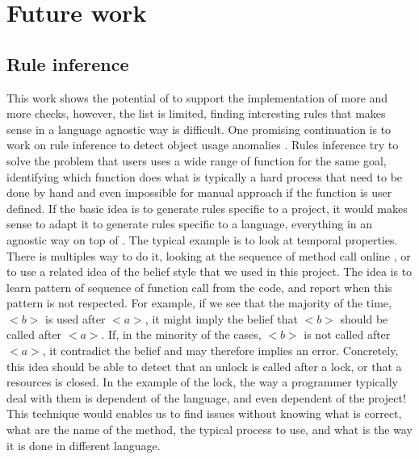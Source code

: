 \section{Future work}
\label{sec:future_work}

\subsection{Rule inference}
\label{subsec:rule_inference}

This work shows the potential of \slang{} to support the implementation of more and more checks, however, the list is limited, finding interesting rules that makes sense in a language agnostic way is difficult. 
One promising continuation is to work on rule inference to detect object usage anomalies \cite{Wasylkowski:2007:DOU:1287624.1287632}. \newline
Rules inference try to solve the problem that users uses a wide range of function for the same goal,  identifying which function does what is typically a hard process that need to be done by hand and even impossible for manual approach if the function is user defined. 
If the basic idea is to generate rules specific to a project, it would makes sense to adapt it to generate rules specific to a language, everything in an agnostic way on top of \slang{}. 
The typical example is to look at temporal properties. 
There is multiples way to do it, looking at the sequence of method call online \cite{Gabel:2010:OIE:1806799.1806806}, or to use a related idea of the belief style \cite{Engler:2001:BDB:502059.502041} that we used in this project. 
The idea is to learn pattern of sequence of function call from the code, and report when this pattern is not respected. 
For example, if we see that the majority of the time, \emph{$<b>$} is used after \emph{$<a>$}, it might imply the belief that \emph{$<b>$} should be called after \emph{$<a>$}. If, in the minority of the cases, \emph{$<b>$} is not called after \emph{$<a>$}, it contradict the belief and may therefore implies an error. 
Concretely, this idea should be able to detect that an unlock is called after a lock, or that a resources is closed. 
In the example of the lock, the way a programmer typically deal with them is dependent of the language, and even dependent of the project! \newline
This technique would enables us to find issues without knowing what is correct, what are the name of the method, the typical process to use, and what is the way it is done in different language.

